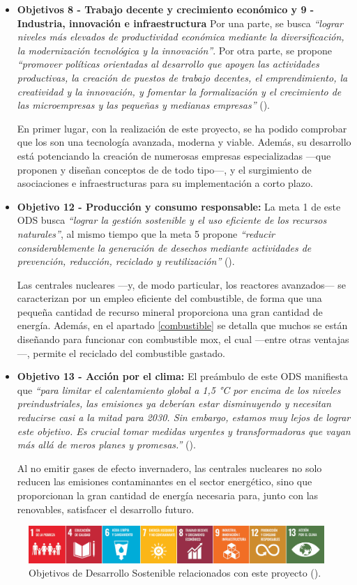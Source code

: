 \begin{itemize}
    \item \textbf{Objetivos 8 - Trabajo decente y crecimiento económico y 9 - Industria, innovación e infraestructura} Por una parte, se busca \textit{``lograr niveles más elevados de productividad económica mediante la diversificación, la modernización tecnológica y la innovación''}. Por otra parte, se propone \textit{``promover políticas orientadas al desarrollo que apoyen las actividades productivas, la creación de puestos de trabajo decentes, el emprendimiento, la creatividad y la innovación, y fomentar la formalización y el crecimiento de las microempresas y las pequeñas y medianas empresas''} (\cite{ODS}).
    
    En primer lugar, con la realización de este proyecto, se ha podido comprobar que los  son una tecnología avanzada, moderna y viable. Además, su desarrollo está potenciando la creación de numerosas empresas especializadas ---que proponen y diseñan conceptos de  de todo tipo---, y el surgimiento de asociaciones e infraestructuras para su implementación a corto plazo.

    \item \textbf{Objetivo 12 - Producción y consumo responsable:} La meta 1 de este ODS busca \textit{``lograr la gestión sostenible y el uso eficiente de los recursos naturales''}, al mismo tiempo que la meta 5 propone \textit{``reducir considerablemente la generación de desechos mediante actividades de prevención, reducción, reciclado y reutilización''} (\cite{ODS}).
    
    Las centrales nucleares ---y, de modo particular, los reactores avanzados--- se caracterizan por un empleo eficiente del combustible, de forma que una pequeña cantidad de recurso mineral proporciona una gran cantidad de energía. Además, en el apartado \ref{combustible} se detalla que muchos  se están diseñando para funcionar con combustible \acrshort{mox}, el cual ---entre otras ventajas---, permite el reciclado del combustible gastado. 
    
    \item \textbf{Objetivo 13 - Acción por el clima:} El preámbulo de este ODS manifiesta que \textit{``para limitar el calentamiento global a 1,5 °C por encima de los niveles preindustriales, las emisiones ya deberían estar disminuyendo y necesitan reducirse casi a la mitad para 2030. Sin embargo, estamos muy lejos de lograr este objetivo.
    Es crucial tomar medidas urgentes y transformadoras que vayan más allá de meros planes y promesas.''} (\cite{ODS}).

    Al no emitir gases de efecto invernadero, las centrales nucleares no solo reducen las emisiones contaminantes en el sector energético, sino que proporcionan la gran cantidad de energía necesaria para, junto con las renovables, satisfacer el desarrollo futuro.
\end{itemize}

\begin{figure}[h!]
    \centering
    \includegraphics[width=\textwidth]{content/figures/ODS_TFG.png}
    \caption{Objetivos de Desarrollo Sostenible relacionados con este proyecto (\cite{ODS}).}
    \label{fig:ods_tfg}
  \end{figure}